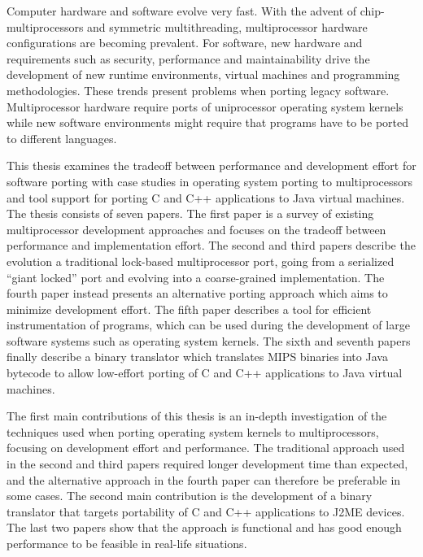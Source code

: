 
Computer hardware and software evolve very fast. With the advent of
chip-multi\-processors and symmetric multithreading, multiprocessor hardware
configurations are becoming prevalent. For software, new hardware and
requirements such as security, performance and maintainability drive the
development of new runtime environments, virtual machines and programming
methodologies. These trends present problems when porting legacy
software. Multiprocessor hardware require ports of uniprocessor operating
system kernels while new software environments might require that programs
have to be ported to different languages.

This thesis examines the tradeoff between performance and development effort
for software porting with case studies in operating system porting to
multiprocessors and tool support for porting C and C++ applications to Java
virtual machines. The thesis consists of seven papers. The first paper is a
survey of existing multiprocessor development approaches and focuses on the
tradeoff between performance and implementation effort. The second and third
papers describe the evolution a traditional lock-based multiprocessor port,
going from a serialized ``giant locked'' port and evolving into a
coarse-grained implementation. The fourth paper instead presents an
alternative porting approach which aims to minimize development effort. The
fifth paper describes a tool for efficient instrumentation of programs, which
can be used during the development of large software systems such as operating
system kernels. The sixth and seventh papers finally describe a binary
translator which translates MIPS binaries into Java bytecode to allow
low-effort porting of C and C++ applications to Java virtual machines.



The first main contributions of this thesis is an in-depth investigation of
the techniques used when porting operating system kernels to multiprocessors,
focusing on development effort and performance. The traditional approach used
in the second and third papers required longer development time than expected,
and the alternative approach in the fourth paper can therefore be preferable
in some cases. The second main contribution is the development of a binary
translator that targets portability of C and C++ applications to J2ME
devices. The last two papers show that the approach is functional and has good
enough performance to be feasible in real-life situations.



